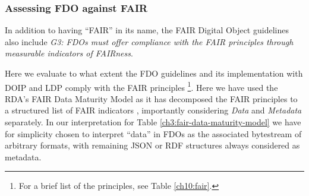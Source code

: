 \subsubsection{Assessing FDO against FAIR}\label{ch3:fair-compare}

In addition to having ``\acrshort{FAIR}'' in its name, the FAIR Digital Object guidelines \cite{Anders 2023} also include \emph{G3: FDOs must offer compliance with the FAIR principles through measurable indicators of FAIRness}.

Here we evaluate to what extent the \acrshort{FDO} guidelines and its implementation with \acrshort{DOIP} and \acrfull{LDP} \cite{Bonino 2020} comply with the FAIR principles \cite{Wilkinson 2016}\footnote{
  For a brief list of the principles, see Table \vref{ch10:fair}.
}. Here we have used the \acrshort{RDA}'s FAIR Data Maturity Model \cite{FAIR Maturity 2020} as it has decomposed the FAIR principles to a structured list of FAIR indicators \cite{Bahui 2020}, importantly considering \emph{Data} and \emph{Metadata} separately. In our interpretation for Table \vref{ch3:fair-data-maturity-model} we have for simplicity chosen to interpret ``data'' in FDOs as the associated bytestream of arbitrary formats, with remaining \acrshort{JSON} or \acrshort{RDF} structures always considered as metadata.

